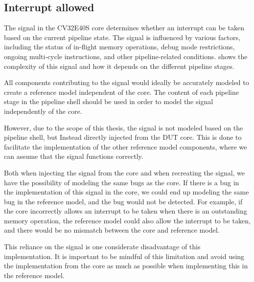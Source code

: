 \subsection{Interrupt allowed}
\label{sec:interrupt_allowed}


The  signal in the CV32E40S core determines whether an interrupt can be taken based on the current pipeline state. The signal is influenced by various factors, including the status of in-flight memory operations, debug mode restrictions, ongoing multi-cycle instructions, and other pipeline-related conditions.  shows the complexity of this signal and how it depends on the different pipeline stages.


All components contributing to the  signal would ideally be accurately modeled to create a reference model independent of the core. The content of each pipeline stage in the pipeline shell should be used in order to model the  signal independently of the core. 

However, due to the scope of this thesis, the  signal is not modeled based on the pipeline shell, but Instead directly injected from the DUT core. This is done to facilitate the implementation of the other reference model components, where we can assume that the  signal functions correctly.

Both when injecting the  signal from the core and when recreating the signal, we have the possibility of modeling the same bugs as the core. If there is a bug in the implementation of this signal in the core, we could end up modeling the same bug in the reference model, and the bug would not be detected. For example, if the core incorrectly allows an interrupt to be taken when there is an outstanding memory operation, the reference model could also allow the interrupt to be taken, and there would be no mismatch between the core and reference model.

This reliance on the  signal is one considerate disadvantage of this implementation. It is important to be mindful of this limitation and avoid using the implementation from the core as much as possible when implementing this in the reference model.

